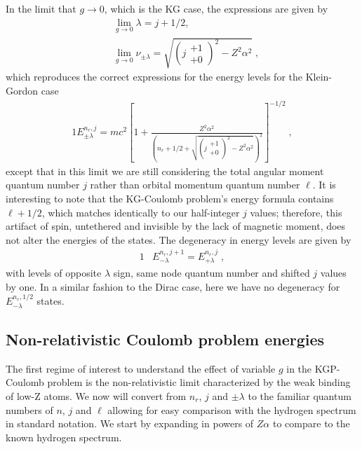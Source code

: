 In the limit that $g\rightarrow 0$, which is the KG case, the expressions are given by
\begin{subequations}
\begin{alignat}{1}
\label{glimit04} &\lim_{g\rightarrow0}\lambda=j+1/2,\\
&\lim_{g\rightarrow0}\nu_{\pm\lambda}=\sqrt{\left(j\begin{smallmatrix} +1 \\ +0 \end{smallmatrix}\right)^{2}-Z^{2}\alpha^{2}}\;,
\end{alignat}
\end{subequations}
which reproduces the correct expressions for the energy levels for the Klein-Gordon case 
\begin{alignat}{1}
\label{glimit05} E_{\pm\lambda}^{n_{r},j}=mc^{2}\left[1+\displaystyle\frac{Z^{2}\alpha^{2}}{\left(n_{r}+1/2+\displaystyle\sqrt{\left(j\begin{smallmatrix} +1 \\ +0 \end{smallmatrix}\right)^{2}-Z^{2}\alpha^{2}}\right)^{2}}\right]^{-1/2}\;,
\end{alignat}
except that in this limit we are still considering the total angular moment quantum number $j$ rather than orbital momentum quantum number $\ell$. It is interesting to note that the KG-Coulomb problem's energy formula contains $\ell+1/2$, which matches identically to our half-integer $j$ values; therefore, this artifact of spin, untethered and invisible by the lack of magnetic moment, does not alter the energies of the states. The degeneracy in energy levels are given by 
\begin{alignat}{1}
\label{glimit06} &E^{n_{r},j+1}_{-\lambda}=E^{n_{r},j}_{+\lambda}\;,\end{alignat}
with levels of opposite $\lambda$ sign, same node quantum number and shifted $j$ values by one. In a similar fashion to the Dirac case, here we have no degeneracy for $E^{n_{r},1/2}_{-\lambda}$ states.

\subsection{Non-relativistic Coulomb problem energies} \label{nonrel}
The first regime of interest to understand the effect of variable $g$ in the KGP-Coulomb problem is the non-relativistic limit characterized by the weak binding of low-Z atoms. We now will convert from $n_{r}$, $j$ and $\pm\lambda$ to the familiar quantum numbers of $n$, $j$ and $\ell$ allowing for easy comparison with the hydrogen spectrum in standard notation. We start by expanding  in powers of $Z\alpha$ to compare to the known hydrogen spectrum. 

